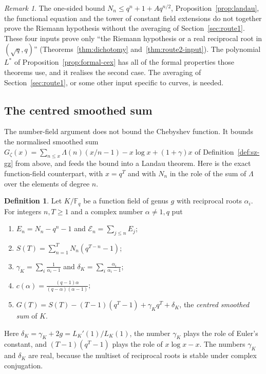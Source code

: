 \documentclass[11pt]{amsbook}
\theoremstyle{plain}
\theoremstyle{definition}
\newtheorem{definition}[theorem]{Definition}
\theoremstyle{remark}
\newtheorem{remark}[theorem]{Remark}
\numberwithin{equation}{section}
\numberwithin{figure}{chapter}
\numberwithin{table}{chapter}
\newcommand{\F}{\mathbb{F}}
\newcommand{\Gz}{G_{\zeta}}
\newcommand{\calE}{\mathcal{E}}
\begin{document}
\begin{remark}\label{rem:route2}
The one-sided bound $N_n\le q^n+1+Aq^{n/2}$,
Proposition~\ref{prop:landau}, the functional equation and the
tower of constant field extensions do not together prove the
Riemann hypothesis without the averaging of
Section~\ref{sec:route1}. These four inputs prove only ``the
Riemann hypothesis or a real reciprocal root in $(\sqrt q,q)$''
(Theorems~\ref{thm:dichotomy} and~\ref{thm:route2-input}). The
polynomial $L^*$ of Proposition~\ref{prop:formal-cex} has all of
the formal properties those theorems use, and it realises the
second case. The averaging of Section~\ref{sec:route1}, or some
other input specific to curves, is needed.
\end{remark}

\subsection{The centred smoothed sum}

The number-field argument does not bound the Chebyshev function. It
bounds the normalised smoothed sum
$\Gz(x)=\sum_{n\le x}\Lambda(n)(x/n-1)-x\log x+(1+\gamma)x$ of
Definition~\ref{def:sz-gz} from above, and feeds the bound into a
Landau theorem. Here is the exact function-field counterpart, with
$x=q^T$ and with $N_n$ in the role of the sum of $\Lambda$ over the
elements of degree $n$.

\begin{definition}\label{def:smoothed-sum}
Let $K/\F_q$ be a function field of genus $g$ with reciprocal roots
$\alpha_i$. For integers $n,T\ge1$ and a complex number
$\alpha\ne1,q$ put
\begin{enumerate}
\item $E_n=N_n-q^n-1$ and $\calE_n=\sum_{j\le n}E_j$;
\item $S(T)=\sum_{n=1}^TN_n(q^{T-n}-1)$;
\item $\gamma_K=\sum_i\frac1{\alpha_i-1}$ and
$\delta_K=\sum_i\frac{\alpha_i}{\alpha_i-1}$;
\item $c(\alpha)=\frac{(q-1)\alpha}{(q-\alpha)(\alpha-1)}$;
\item $G(T)=S(T)-(T-1)(q^T-1)+\gamma_Kq^T+\delta_K$, the
\emph{centred smoothed sum} of $K$.
\end{enumerate}
\end{definition}

Here $\delta_K=\gamma_K+2g=L_K'(1)/L_K(1)$, the number $\gamma_K$
plays the role of Euler's constant, and $(T-1)(q^T-1)$ plays the
role of $x\log x-x$. The numbers $\gamma_K$ and $\delta_K$ are real,
because the multiset of reciprocal roots is stable under complex
conjugation.
\end{document}
